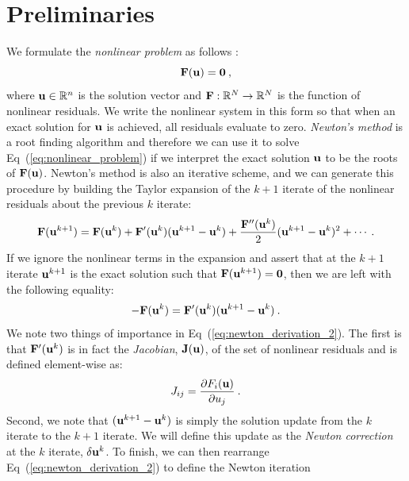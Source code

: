 \section{Preliminaries\ }
\label{sec:nonlinear_preliminaries}
We formulate the \textit{nonlinear problem} as follows
\citep{knoll_jacobian-free_2004}:
\begin{equation}
  \mathbf{F}(\mathbf{u}) = \mathbf{0}\:,
  \label{eq:nonlinear_problem}
\end{equation}
where $\mathbf{u} \in \mathbb{R}^n$ is the solution vector and
$\mathbf{F}:\mathbb{R}^N \rightarrow \mathbb{R}^N$ is the function of
nonlinear residuals. We write the nonlinear system in this form so
that when an exact solution for $\mathbf{u}$ is achieved, all residuals
evaluate to zero. \textit{Newton's method} is a root finding algorithm
and therefore we can use it to solve Eq~(\ref{eq:nonlinear_problem})
if we interpret the exact solution $\mathbf{u}$ to be the roots of
$\mathbf{F}(\mathbf{u})$. Newton's method is also an iterative scheme, and we
can generate this procedure by building the Taylor expansion of the
$k+1$ iterate of the nonlinear residuals about the previous $k$
iterate:
\begin{equation}
  \mathbf{F}(\mathbf{u}^{k+1}) = \mathbf{F}(\mathbf{u}^{k}) +
  \mathbf{F}'(\mathbf{u}^{k})(\mathbf{u}^{k+1}-\mathbf{u}^{k}) +
  \frac{\mathbf{F}''(\mathbf{u}^{k})}{2}(\mathbf{u}^{k+1}-\mathbf{u}^{k})^2 + \cdots
  \:.
  \label{eq:newton_derivation_1}
\end{equation}
If we ignore the nonlinear terms in the expansion and assert that at
the $k+1$ iterate $\mathbf{u}^{k+1}$ is the exact solution such that
$\mathbf{F}(\mathbf{u}^{k+1}) = \mathbf{0}$, then we are left with the following
equality:
\begin{equation}
  -\mathbf{F}(\mathbf{u}^{k}) =
  \mathbf{F}'(\mathbf{u}^{k})(\mathbf{u}^{k+1}-\mathbf{u}^{k})\:.
  \label{eq:newton_derivation_2}
\end{equation}
We note two things of importance in
Eq~(\ref{eq:newton_derivation_2}). The first is that
$\mathbf{F}'(\mathbf{u}^{k})$ is in fact the \textit{Jacobian},
$\mathbf{J}(\mathbf{u})$, of the set of nonlinear residuals and is defined
element-wise as:
\begin{equation}
  J_{ij} = \frac{\partial F_i(\mathbf{u})}{\partial u_j}\:.
  \label{eq:jacobian_def}
\end{equation}
Second, we note that $(\mathbf{u}^{k+1}-\mathbf{u}^{k})$ is simply the
solution update from the $k$ iterate to the $k+1$ iterate. We will
define this update as the \textit{Newton correction} at the $k$
iterate, $\delta \mathbf{u}^k$. To finish, we can then rearrange
Eq~(\ref{eq:newton_derivation_2}) to define the Newton iteration
